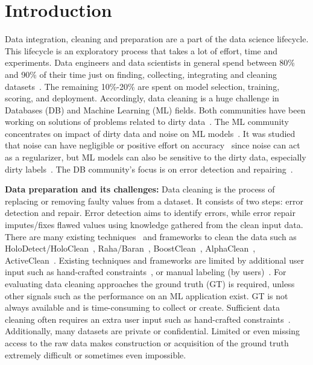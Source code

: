 \chapter{Introduction}
Data integration, cleaning and preparation are a part of the data science lifecycle. 
This lifecycle is an exploratory process that takes a lot of effort, time and experiments.
Data engineers and data scientists in general spend between 80\% and 90\% of their time just on finding, collecting, integrating and cleaning datasets~\cite{80cleansurvey, dataintegration80}. The remaining 10\%-20\% are spent on model selection, training, scoring, and deployment.
Accordingly, data cleaning is a huge challenge in Databases (DB) and Machine Learning (ML) fields.
Both communities have been working on solutions of problems related to dirty data~\cite{cleanml, HammerST05,HalevyKNOPRW16}. 
The ML community concentrates on impact of dirty data and noise on ML models~\cite{cleanml}.
It was studied that noise can have negligible or positive effort on accuracy~\cite{processingsys, outperformstudy} since noise can act as a regularizer, but ML models can also be sensitive to the dirty data, especially dirty labels~\cite{classificationnoisesurvey}.
The DB community's focus is on error detection and repairing~\cite{Hellerstein08quantitativedata, duplicatesstudy}.

\textbf{Data preparation and its challenges:}
Data cleaning is the process of replacing or removing faulty values from a dataset.
It consists of two steps: error detection and repair.
Error detection aims to identify errors, while error repair imputes/fixes flawed values using knowledge gathered from the clean input data. 
There are many existing techniques~\cite{duplicatesstudy, tdeexcel} and frameworks to clean the data such as HoloDetect/HoloClean~\cite{HeidariMIR2019, RekatsinasCIR2017}, Raha/Baran~\cite{raha, baran}, BoostClean~\cite{boostclean}, AlphaClean~\cite{alphaclean}, ActiveClean~\cite{activeclean}. 
Existing techniques and frameworks are limited by additional user input such as hand-crafted constraints~\cite{bart}, or manual labeling (by users)~\cite{raha, baran}.
For evaluating data cleaning approaches the ground truth (GT) is required, unless other signals such as the performance on an ML application exist.
GT is not always available and is time-consuming to collect or create.
Sufficient data cleaning often requires an extra user input such as hand-crafted constraints~\cite{bart}.
Additionally, many datasets are private or confidential. 
Limited or even missing access to the raw data makes construction or acquisition of the ground truth extremely difficult or sometimes even impossible. 

